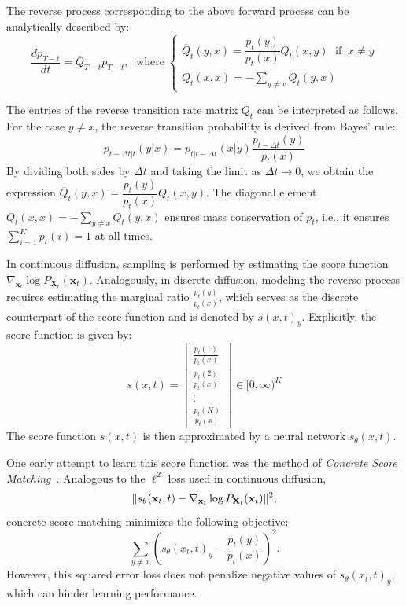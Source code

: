 \documentclass[11pt, a4paper]{article}
\begin{document}
The reverse process corresponding to the above forward process can be analytically described by:
\begin{equation*}
        \frac{dp_{T-t}}{dt}=\overline{Q}_{T-t}p_{T-t}, \;\text{ where}\; \begin{cases}
        \overline{Q}_t(y,x)=\dfrac{p_t(y)}{p_t(x)}Q_t(x,y) \;\text{ if}\;\; x \neq y \\
        \overline{Q}_t(x,x)=-\sum_{y \neq x}\overline{Q}_t(y,x)
    \end{cases}
\end{equation*}

The entries of the reverse transition rate matrix \(\overline{Q}_t\) can be interpreted as follows. For the case \(y \neq x\), the reverse transition probability is derived from Bayes' rule:
\[
p_{t-\Delta t|t}(y|x)=p_{t|t-\Delta t}(x|y)\frac{p_{t-\Delta t}(y)}{p_t(x)}
\]
By dividing both sides by \(\Delta t\) and taking the limit as \(\Delta t \rightarrow 0\), we obtain the expression \(\overline{Q}_t(y,x)=\dfrac{p_t(y)}{p_t(x)}Q_t(x,y)\). The diagonal element \(\overline{Q}_t(x,x)=-\sum_{y \neq x}\overline{Q}_t(y,x)\) ensures mass conservation of \(p_t\), i.e., it ensures \(\sum_{i=1}^K p_t(i)=1\) at all times.

In continuous diffusion, sampling is performed by estimating the score function \( \nabla_{\mathbf{x}_t} \log P_{\mathbf{X}_t}(\mathbf{x}_t) \).
Analogously, in discrete diffusion, modeling the reverse process requires
estimating the marginal ratio \(\frac{p_t(y)}{p_t(x)}\), which serves as the discrete counterpart of the score function and is denoted by \(s(x,t)_y\).
Explicitly, the score function is given by:
\[
s(x,t)= \left[ \begin{matrix}
    \frac{p_t(1)}{p_t(x)} \\
    \frac{p_t(2)}{p_t(x)} \\
    \vdots \\
    \frac{p_t(K)}{p_t(x)}
    \end{matrix} \right] \in [0,\infty)^K
\]
The score function \(s(x,t)\) is then approximated by a neural network \(s_\theta(x,t)\).

One early attempt to learn this score function was the method of \emph{Concrete Score Matching}~\cite{meng2022concrete}. Analogous to the \(\ell^2\) loss used in continuous diffusion,
\[
\|s_\theta({\bf x}_t,t)-\nabla_{{\bf x}_t} \log P_{{\bf X}_t}({\bf x}_t)\|^2,
\]
concrete score matching minimizes the following objective:
\[
\sum_{y\neq x} \left(s_\theta(x_t,t)_y-\frac{p_t(y)}{p_t(x)}\right)^2.
\]
However, this squared error loss does not penalize negative values of \(s_\theta(x_t,t)_y\), which can hinder learning performance.
\end{document}
